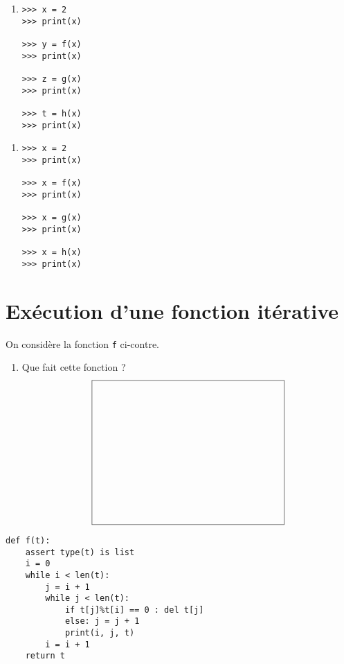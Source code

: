 \documentclass[11pt,a4paper]{article}
\begin{document}
\begin{minipage}{7cm}
\begin{enumerate}
\item 

\begin{py}{3cm}
\begin{verbatim}
>>> x = 2
>>> print(x)

>>> y = f(x)
>>> print(x)

>>> z = g(x)
>>> print(x)

>>> t = h(x)
>>> print(x)
\end{verbatim}
\end{py}

\framebox[5.5cm]{$\rule{0cm}{9cm}$}
\end{enumerate}
\end{minipage}
\hfill
\begin{minipage}{7cm}
\begin{enumerate}

\item

\begin{py}{4cm}
\begin{verbatim}
>>> x = 2
>>> print(x)

>>> x = f(x)
>>> print(x)

>>> x = g(x)
>>> print(x)

>>> x = h(x)
>>> print(x)
\end{verbatim}
\end{py}

\framebox[5.5cm]{$\rule{0cm}{9cm}$}

\end{enumerate}
\end{minipage}


\section{Exécution d'une fonction itérative}

\begin{minipage}[t]{8cm}
On considère la fonction {\tt f} ci-contre.
\begin{enumerate}
\item Que fait cette fonction ?
	$$\framebox[7cm]{$\rule{0cm}{5cm}$}$$
\end{enumerate}
\end{minipage}
\hfill
\begin{py}{7cm}
\begin{verbatim}
def f(t):
    assert type(t) is list
    i = 0
    while i < len(t):
        j = i + 1
        while j < len(t):
            if t[j]%t[i] == 0 : del t[j]
            else: j = j + 1
            print(i, j, t)
        i = i + 1
    return t
\end{verbatim}
\end{py}
\end{document}
